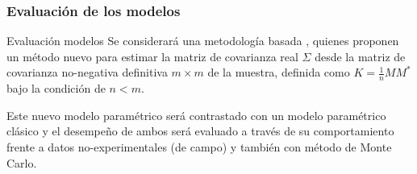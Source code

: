 \subsubsection{Evaluaci\'on de los modelos}
\begin{frame}{Evaluaci\'on modelos}
Se considerar\'a una metodolog\'ia basada \cite{Tucci2019}, quienes proponen un m\'etodo nuevo para estimar la matriz de covarianza real $\Sigma$ desde la matriz de covarianza no-negativa definitiva $m \times m$ de la muestra, definida como $K = \frac{1}{n}MM^*$ bajo la condici\'on de $n<m$.\vspace{\baselineskip}

Este nuevo modelo param\'etrico ser\'a contrastado con un modelo param\'etrico cl\'asico y el desempeño de ambos ser\'a evaluado a trav\'es de su comportamiento frente a datos no-experimentales (de campo) y tambi\'en con m\'etodo de Monte Carlo.

\end{frame}